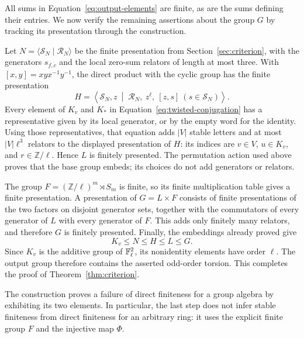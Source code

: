 All sums in Equation~\eqref{eq:output-elements} are finite, as are the
sums defining their entries. We now verify the remaining assertions about
the group $G$ by tracking its presentation through the construction.

Let $N=\langle\mathcal S_N\mid\mathcal R_N\rangle$ be the finite
presentation from Section~\ref{sec:criterion}, with the generators
$s_{f,c}$ and the local zero-sum relators of length at most three. With
$[x,y]=xyx^{-1}y^{-1}$, the direct product with the cyclic group has the
finite presentation
\[
H=\left\langle\mathcal S_N,z\ \middle|\;
\mathcal R_N,\ z^\ell,\ [z,s]\ (s\in\mathcal S_N)\right\rangle.
\]
Every element of $K_v$ and $K_*$ in
Equation~\eqref{eq:twisted-conjugation} has a representative given by
its local generator, or by the empty word for the identity. Using those
representatives, that equation adds $|V|$ stable letters and at most
$|V|\ell^3$ relators to the displayed presentation of $H$: its indices
are $v\in V$, $u\in K_v$, and $r\in\mathbb Z/\ell$. Hence $L$ is
finitely presented. The permutation action used above proves that the
base group embeds; its choices do not add generators or relators.

The group $F=(\mathbb Z/\ell)^m\rtimes S_m$ is finite, so its finite
multiplication table gives a finite presentation. A presentation of
$G=L\times F$ consists of finite presentations of the two factors on
disjoint generator sets, together with the commutators of every generator
of $L$ with every generator of $F$. This adds only finitely many relators,
and therefore $G$ is finitely presented. Finally, the embeddings already
proved give
\[
K_v\le N\le H\le L\le G.
\]
Since $K_v$ is the additive group of $\mathbb F_\ell^2$, its nonidentity
elements have order $\ell$. The output group therefore contains the
asserted odd-order torsion. This completes the proof of
Theorem~\ref{thm:criterion}.

The construction proves a failure of direct finiteness for a group
algebra by exhibiting its two elements. In particular, the last step
does not infer stable finiteness from direct finiteness for an arbitrary
ring: it uses the explicit finite group $F$ and the injective map
$\Phi$.
